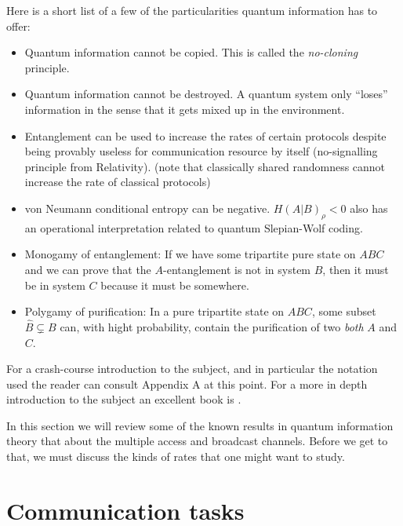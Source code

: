 \documentclass[aps,11pt,twoside,letterpaper]{article}
\begin{document}
	Here is a short list of a few of the particularities quantum information has to offer:
	
	\begin{itemize}
		\item 	Quantum information cannot be copied. This is called the \emph{no-cloning} principle.
		\item 	Quantum information cannot be destroyed. A quantum system only ``loses'' 
				information in the sense that it gets mixed up in the environment.
		\item 	Entanglement can be used to increase the rates of certain protocols despite being
				provably useless for communication resource by itself (no-signalling principle from Relativity).
				(note that classically shared randomness cannot increase the rate of classical protocols)
		\item 	von Neumann conditional entropy can be negative. 
				$H(A|B)_\rho < 0$ also has an operational interpretation related to quantum Slepian-Wolf coding.
		\item 	Monogamy of entanglement:  If we have some tripartite pure state on $ABC$ and we
				can prove that the $A$-entanglement is not in system $B$, then it must be in system $C$ 
				because it must be somewhere.
		\item		Polygamy of purification: In a pure tripartite state on $ABC$, some subset $\hat{B} \subsetneq B $ can,
				with hight probability, contain the purification of two \emph{both} $A$ and $C$.
	\end{itemize}	

	For a crash-course introduction to the subject, and in particular the notation
	used the reader can consult Appendix A at this point.
	For a more in depth introduction to the subject an excellent book is \cite{NC04}.


	In this section we will review some of the known results in quantum information theory
	that about the multiple access and broadcast channels. 
	Before we get to that, we must discuss the kinds of rates that one might want to study.


	\section{Communication tasks}
			
\end{document}
